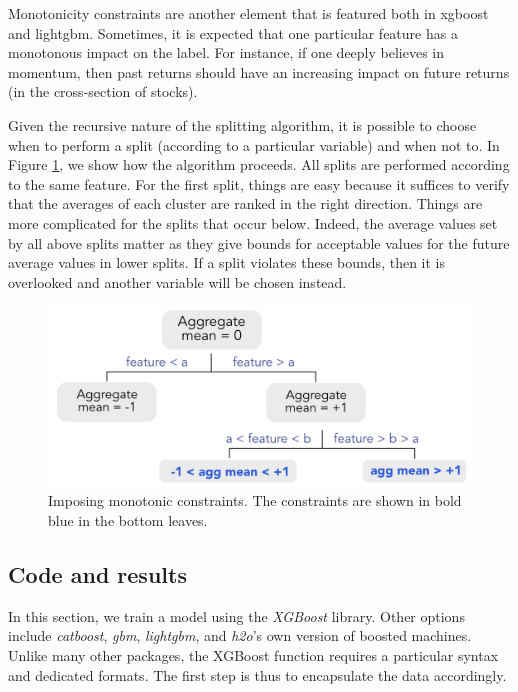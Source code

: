 \documentclass[]{krantz}
\theoremstyle{definition}
\theoremstyle{definition}
\theoremstyle{definition}
\theoremstyle{remark}
\begin{document}
Monotonicity constraints are another element that is featured both in
xgboost and lightgbm. Sometimes, it is expected that one particular
feature has a monotonous impact on the label. For instance, if one
deeply believes in momentum, then past returns should have an increasing
impact on future returns (in the cross-section of stocks).

Given the recursive nature of the splitting algorithm, it is possible to
choose when to perform a split (according to a particular variable) and
when not to. In Figure \ref{fig:monotonic}, we show how the algorithm
proceeds. All splits are performed according to the same feature. For
the first split, things are easy because it suffices to verify that the
averages of each cluster are ranked in the right direction. Things are
more complicated for the splits that occur below. Indeed, the average
values set by all above splits matter as they give bounds for acceptable
values for the future average values in lower splits. If a split
violates these bounds, then it is overlooked and another variable will
be chosen instead.

\begin{figure}[b]
\includegraphics[width=16.4in]{images/tree_monotonic} \caption{Imposing monotonic constraints. The constraints are shown in bold blue in the bottom leaves.}\label{fig:monotonic}
\end{figure}

\hypertarget{boostcode}{%
\subsection{Code and results}\label{boostcode}}

In this section, we train a model using the \emph{XGBoost} library.
Other options include \emph{catboost}, \emph{gbm}, \emph{lightgbm}, and
\emph{h2o}'s own version of boosted machines. Unlike many other
packages, the XGBoost function requires a particular syntax and
dedicated formats. The first step is thus to encapsulate the data
accordingly.
\end{document}
